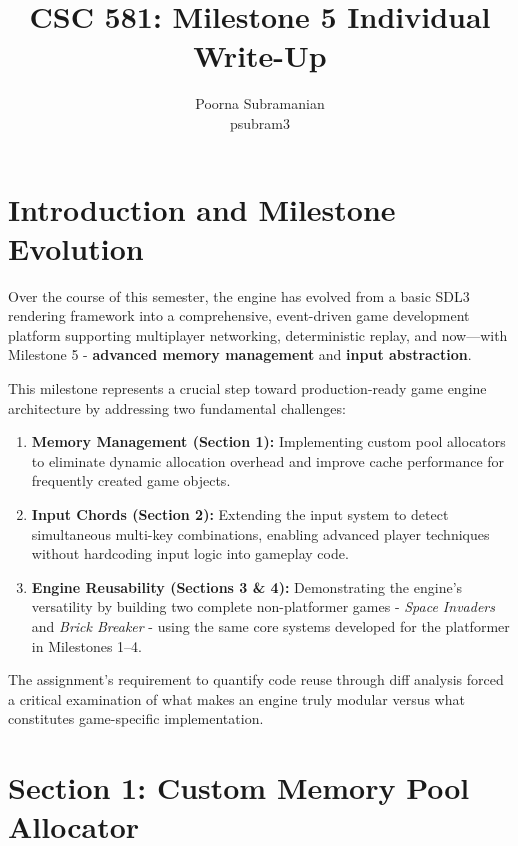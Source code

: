 \documentclass[12pt]{article}
\title{\vspace{-2cm}\textbf{CSC 581: Milestone 5 Individual Write-Up}}
\author{Poorna Subramanian \\ psubram3}
\date{}
\begin{document}
\maketitle
\vspace{-1em}

\section{Introduction and Milestone Evolution}

Over the course of this semester, the engine has evolved from a basic SDL3 rendering framework into a comprehensive, event-driven game development platform supporting multiplayer networking, deterministic replay, and now—with Milestone 5 - \textbf{advanced memory management} and \textbf{input abstraction}.

This milestone represents a crucial step toward production-ready game engine architecture by addressing two fundamental challenges:
\begin{enumerate}
  \item \textbf{Memory Management (Section 1):} Implementing custom pool allocators to eliminate dynamic allocation overhead and improve cache performance for frequently created game objects.
  \item \textbf{Input Chords (Section 2):} Extending the input system to detect simultaneous multi-key combinations, enabling advanced player techniques without hardcoding input logic into gameplay code.
  \item \textbf{Engine Reusability (Sections 3 \& 4):} Demonstrating the engine's versatility by building two complete non-platformer games - \emph{Space Invaders} and \emph{Brick Breaker} - using the same core systems developed for the platformer in Milestones 1–4.
\end{enumerate}

The assignment's requirement to quantify code reuse through diff analysis forced a critical examination of what makes an engine truly modular versus what constitutes game-specific implementation.

\section{Section 1: Custom Memory Pool Allocator}
\end{document}
